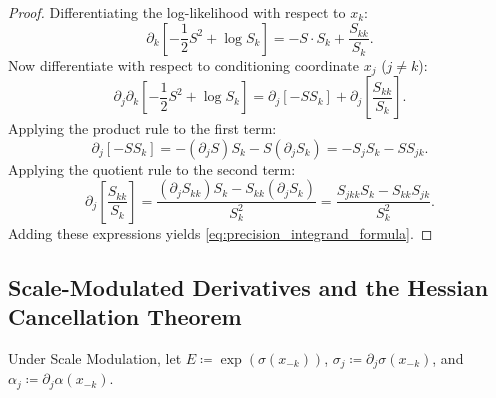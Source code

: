 \documentclass[11pt,a4paper]{article}
\theoremstyle{plain}
\theoremstyle{definition}
\theoremstyle{remark}
\begin{document}
\begin{proof}
Differentiating the log-likelihood with respect to $x_k$:
\begin{equation}
    \partial_k \left[ -\frac{1}{2} S^2 + \log S_k \right] = -S \cdot S_k + \frac{S_{kk}}{S_k}.
\end{equation}
Now differentiate with respect to conditioning coordinate $x_j$ ($j \neq k$):
\begin{equation}
    \partial_j \partial_k \left[ -\frac{1}{2} S^2 + \log S_k \right] = \partial_j \left[ -S S_k \right] + \partial_j \left[ \frac{S_{kk}}{S_k} \right].
\end{equation}
Applying the product rule to the first term:
\begin{equation}
    \partial_j \left[ -S S_k \right] = -(\partial_j S) S_k - S (\partial_j S_k) = -S_j S_k - S S_{jk}.
\end{equation}
Applying the quotient rule to the second term:
\begin{equation}
    \partial_j \left[ \frac{S_{kk}}{S_k} \right] = \frac{(\partial_j S_{kk}) S_k - S_{kk} (\partial_j S_k)}{S_k^2} = \frac{S_{jkk} S_k - S_{kk} S_{jk}}{S_k^2}.
\end{equation}
Adding these expressions yields \eqref{eq:precision_integrand_formula}.
\end{proof}

\subsection{Scale-Modulated Derivatives and the Hessian Cancellation Theorem}

Under Scale Modulation, let $E \coloneqq \exp(\sigma(x_{-k}))$, $\sigma_j \coloneqq \partial_j \sigma(x_{-k})$, and $\alpha_j \coloneqq \partial_j \alpha(x_{-k})$. 
\end{document}
